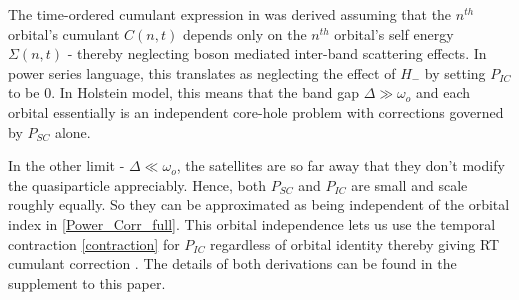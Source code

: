 \documentclass[%
 reprint,
 amsmath,amssymb,
 aps,prl,
floatfix
]{revtex4-2}
\begin{document}
 The time-ordered cumulant expression in \cite{aryasetiawan_multiple_1996,gumhalter_combined_2016, caruso_band_2015,lischner_physical_2013} was derived assuming that the $n^{th}$ orbital's cumulant $C(n,t)$ depends only on the $n^{th}$ orbital's self energy $\Sigma(n,t)$ - thereby neglecting boson mediated inter-band scattering effects. In power series language, this translates as neglecting the effect of $H_-$ by setting $P_{IC}$ to be 0. In Holstein model, this means that the band gap $\Delta \gg \omega_o$ and each orbital essentially is an independent core-hole problem with corrections governed by $P_{SC}$ alone.

In the other limit - $\Delta \ll \omega_o$, the satellites are so far away that they don't modify the quasiparticle appreciably. Hence, both $P_{SC}$  and $P_{IC}$ are small and scale roughly equally. So they can be approximated as being independent of the orbital index in \eqref{Power_Corr_full}. This orbital independence lets us use the temporal contraction \eqref{contraction} for $P_{IC}$ regardless of orbital identity thereby giving RT cumulant correction \cite{kas_cumulant_2014,guzzo_multiple_2014}. The details of both derivations can be found in the supplement to this paper.
\end{document}
